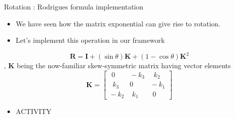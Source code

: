 \documentclass[presentation]{beamer}
\newcommand{\bv}[1]{\ensuremath{\mathbf{#1}}}
\begin{document}
\begin{frame}[label={sec:orgc945898}]{Rotation : Rodrigues formula implementation}
\begin{itemize}
\item We have seen how the matrix exponential can give rise to rotation.
\item Let's implement this operation in our framework
\end{itemize}
\[ \mathbf {R} =\mathbf {I} +(\sin \theta )\mathbf {K} +(1-\cos \theta )\mathbf {K} ^{2} \]
, \(\bv{K}\) being the now-familiar skew-symmetric matrix having vector elements
\[ \mathbf {K} = \begin{bmatrix}\,\,0&\!-k_{3}&\,\,\,k_{2}\\\,\,\,k_{3}&0&\!-k_{1}\\\!-k_{2}&\,\,k_{1}&\,\,0\end{bmatrix}
   \]
\begin{itemize}
\item \alert{ACTIVITY}
\end{itemize}
\end{frame}
\end{document}
